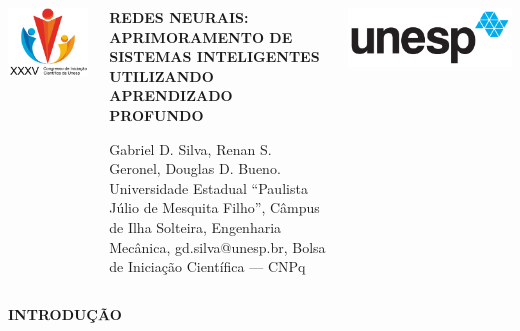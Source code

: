 \documentclass[serif,20pt]{beamer}
\begin{document}
\begin{frame}[t]
\vspace{5cm}
\begin{columns}
\includegraphics[width=\columnwidth]{cic_logo.png}
\begin{center}\Large{%
    \bfseries REDES NEURAIS: APRIMORAMENTO DE SISTEMAS INTELIGENTES UTILIZANDO APRENDIZADO PROFUNDO}

    \small{Gabriel D. Silva, Renan S. Geronel, Douglas D. Bueno. Universidade Estadual ``Paulista Júlio de Mesquita Filho'', Câmpus de Ilha Solteira, Engenharia Mecânica, gd.silva@unesp.br, Bolsa de Iniciação Científica --- CNPq}
\end{center}
\includegraphics[width=\columnwidth]{unesp_logo.png}
\end{columns}

\vspace{5cm}

\begin{columns}[t]
\begin{block}{\centering\bfseries INTRODUÇÃO}


\end{block}
\end{columns}
\end{frame}
\end{document}
